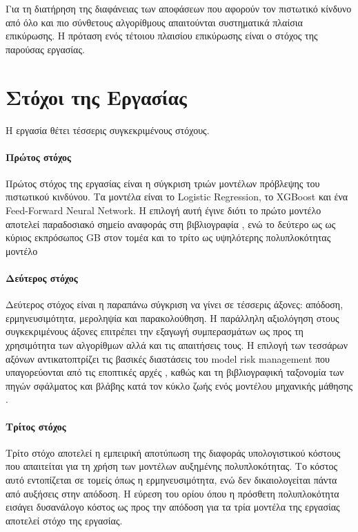 Για τη διατήρηση της διαφάνειας των αποφάσεων που αφορούν τον πιστωτικό
κίνδυνο από όλο και πιο σύνθετους αλγορίθμους απαιτούνται συστηματικά
πλαίσια επικύρωσης. Η πρόταση ενός τέτοιου πλαισίου επικύρωσης είναι ο
στόχος της παρούσας εργασίας.

\section{Στόχοι της Εργασίας}
\label{sec:objectives}

Η εργασία θέτει τέσσερις συγκεκριμένους στόχους.

\paragraph{Πρώτος στόχος}
Πρώτος στόχος της εργασίας είναι η σύγκριση τριών μοντέλων πρόβλεψης του
πιστωτικού κινδύνου. Τα μοντέλα είναι το Logistic Regression, το XGBoost και
ένα Feed-Forward Neural Network. Η επιλογή αυτή έγινε διότι το πρώτο μοντέλο
αποτελεί παραδοσιακό σημείο αναφοράς στη βιβλιογραφία \citep{lessmann2015benchmarking, hand1997statistical}, 
ενώ το δεύτερο ως ως κύριος εκπρόσωπος GB στον τομέα \citep{gunnarsson2021deep, bracke2019machine} 
και το τρίτο ως υψηλότερης πολυπλοκότητας μοντέλο \citep{west2000neural, gunnarsson2021deep}

\paragraph{Δεύτερος στόχος}
Δεύτερος στόχος είναι η παραπάνω σύγκριση να γίνει σε τέσσερις άξονες:
απόδοση, ερμηνευσιμότητα, μεροληψία και παρακολούθηση. Η παράλληλη αξιολόγηση
στους συγκεκριμένους άξονες επιτρέπει την εξαγωγή συμπερασμάτων ως προς τη
χρησιμότητα των αλγορίθμων αλλά και τις απαιτήσεις τους. Η επιλογή των τεσσάρων 
αξόνων αντικατοπτρίζει τις βασικές διαστάσεις του model risk management που 
υπαγορεύονται από τις εποπτικές αρχές \citep{sr117, eba2023, bis2024principles}, 
καθώς και τη βιβλιογραφική ταξονομία των πηγών σφάλματος και βλάβης κατά τον κύκλο 
ζωής ενός μοντέλου μηχανικής μάθησης \citep{suresh2021framework}.


\paragraph{Τρίτος στόχος}
Τρίτο στόχο αποτελεί η εμπειρική αποτύπωση της διαφοράς υπολογιστικού κόστους
που απαιτείται για τη χρήση των μοντέλων αυξημένης πολυπλοκότητας. Το κόστος
αυτό εντοπίζεται σε τομείς όπως η ερμηνευσιμότητα,
ενώ δεν δικαιολογείται πάντα από αυξήσεις στην απόδοση. Η εύρεση του ορίου
όπου η πρόσθετη πολυπλοκότητα εισάγει δυσανάλογο κόστος ως προς την απόδοση
για τα τρία μοντέλα της εργασίας αποτελεί στόχο της εργασίας.

